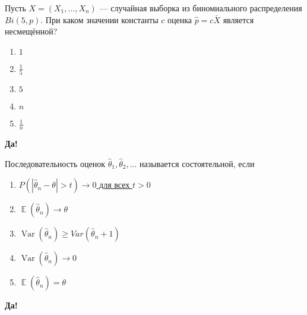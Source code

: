 \documentclass[t]{beamer}
\DeclareMathOperator{\Var}{Var}
\DeclareMathOperator{\E}{\mathbb{E}}
\begin{document}
 \begin{frame} \label{43-Yes} 
\begin{block}{43} 

Пусть $X = (X_1, \ldots , X_n)$ — случайная выборка из биномиального распределения $Bi(5, p)$. При каком значении константы $c$ оценка  $\hat{p} = c \bar{X}$ является несмещённой?
  


 \end{block} 
\begin{enumerate} 
\item[] \hyperlink{43-No}{\beamergotobutton{} $1$}
\item[] \hyperlink{43-Yes}{\beamergotobutton{} $\frac{1}{5}$}
\item[] \hyperlink{43-No}{\beamergotobutton{} $5$}
\item[] \hyperlink{43-No}{\beamergotobutton{} $n$}
\item[] \hyperlink{43-No}{\beamergotobutton{} $\frac{1}{n}$}
\end{enumerate} 

 \textbf{Да!} 
 \hyperlink{44}{}\end{frame} 


 \begin{frame} \label{44-Yes} 
\begin{block}{44} 

Последовательность оценок $\hat{\theta}_1, \hat{\theta}_2, ...$ называется состоятельной, если
  


 \end{block} 
\begin{enumerate} 
\item[] \hyperlink{44-Yes}{\beamergotobutton{} $P(|\hat\theta_n - \theta | > t) \to 0$ для всех $t > 0$}
\item[] \hyperlink{44-No}{\beamergotobutton{} $\E(\hat\theta_n) \to \theta$}
\item[] \hyperlink{44-No}{\beamergotobutton{} $\Var(\hat\theta_n) \geq Var(\hat\theta_n + 1)$}
\item[] \hyperlink{44-No}{\beamergotobutton{} $\Var(\hat\theta_n) \to 0$}
\item[] \hyperlink{44-No}{\beamergotobutton{} $\E(\hat\theta_n) = \theta$}
\end{enumerate} 

 \textbf{Да!} 
 \hyperlink{45}{}\end{frame} 
\end{document}
